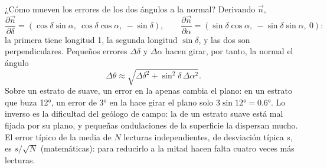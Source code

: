 ¿Cómo mueven los errores de los dos ángulos a la normal? Derivando $\vec n$,
\[
  \frac{\partial\vec n}{\partial\delta} = (\cos\delta\sin\alpha,\ \cos\delta\cos\alpha,\ -\sin\delta),
  \qquad
  \frac{\partial\vec n}{\partial\alpha} = (\sin\delta\cos\alpha,\ -\sin\delta\sin\alpha,\ 0):
\]
la primera tiene longitud 1, la segunda longitud $\sin\delta$, y las dos son perpendiculares. Pequeños
errores $\Delta\delta$ y $\Delta\alpha$ hacen girar, por tanto, la normal el ángulo
\[
  \Delta\theta \approx \sqrt{\Delta\delta^2 + \sin^2\delta\,\Delta\alpha^2}.
\]
Sobre un estrato de  suave, un error en la  apenas cambia el plano: en un
estrato que buza \ang{12}, un error de \ang{3} en la  hace girar el plano solo
$3\sin\ang{12} = \ang{0.6}$. Lo inverso es la dificultad del geólogo de campo: la  de
un estrato suave está mal fijada por su plano, y pequeñas ondulaciones de la superficie la dispersan mucho.
El error típico de la media de $N$ lecturas independientes, de desviación típica $s$, es $s/\sqrt N$
(matemáticas): para reducirlo a la mitad hacen falta cuatro veces más lecturas.

